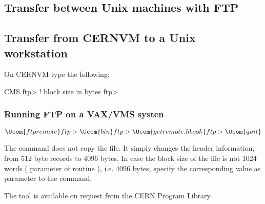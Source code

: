 \subsection*{Transfer between Unix machines with FTP}


\subsection*{Transfer from CERNVM to a Unix workstation}

On CERNVM  type the following:

\begin{XMP}
CMS 
ftp>      ! block size in bytes
ftp> 
\end{XMP}

\subsubsection*{Running FTP on a VAX/VMS systen}

\begin{XMP}
$ 
ftp> 
ftp> 
ftp> 
$ 
\end{XMP}

The  command does not copy the file. 
It simply changes the header information, from 512 byte records to 4096 bytes.
In case the block size of the \HBOOK{} file is not 1024 words  (
parameter of routine ), i.e. 4096 bytes, specify the corresponding
value as parameter to the  command.

The  tool is available on request from the CERN Program Library.

\bigskip


